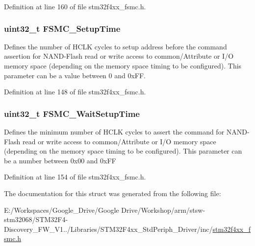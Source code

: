 Definition at line 160 of file stm32f4xx\-\_\-fsmc.\-h.

\hypertarget{struct_f_s_m_c___n_a_n_d___p_c_c_a_r_d_timing_init_type_def_a3b0b076d6c5cae5a023aba6d74ffb1b7}{
\subsubsection[{F\-S\-M\-C\-\_\-\-Setup\-Time}]{\setlength{\rightskip}{0pt plus 5cm}uint32\-\_\-t F\-S\-M\-C\-\_\-\-Setup\-Time}}\label{struct_f_s_m_c___n_a_n_d___p_c_c_a_r_d_timing_init_type_def_a3b0b076d6c5cae5a023aba6d74ffb1b7}
Defines the number of H\-C\-L\-K cycles to setup address before the command assertion for N\-A\-N\-D-\/\-Flash read or write access to common/\-Attribute or I/\-O memory space (depending on the memory space timing to be configured). This parameter can be a value between 0 and 0x\-F\-F. 

Definition at line 148 of file stm32f4xx\-\_\-fsmc.\-h.

\hypertarget{struct_f_s_m_c___n_a_n_d___p_c_c_a_r_d_timing_init_type_def_abf4f8b523317ce9a2e079c2b5ac1d857}{
\subsubsection[{F\-S\-M\-C\-\_\-\-Wait\-Setup\-Time}]{\setlength{\rightskip}{0pt plus 5cm}uint32\-\_\-t F\-S\-M\-C\-\_\-\-Wait\-Setup\-Time}}\label{struct_f_s_m_c___n_a_n_d___p_c_c_a_r_d_timing_init_type_def_abf4f8b523317ce9a2e079c2b5ac1d857}
Defines the minimum number of H\-C\-L\-K cycles to assert the command for N\-A\-N\-D-\/\-Flash read or write access to common/\-Attribute or I/\-O memory space (depending on the memory space timing to be configured). This parameter can be a number between 0x00 and 0x\-F\-F 

Definition at line 154 of file stm32f4xx\-\_\-fsmc.\-h.



The documentation for this struct was generated from the following file\-:\begin{DoxyCompactItemize}
\item 
E\-:/\-Workspaces/\-Google\-\_\-\-Drive/\-Google Drive/\-Workshop/arm/stsw-\/stm32068/\-S\-T\-M32\-F4-\/\-Discovery\-\_\-\-F\-W\-\_\-\-V1../\-Libraries/\-S\-T\-M32\-F4xx\-\_\-\-Std\-Periph\-\_\-\-Driver/inc/\hyperlink{stm32f4xx__fsmc_8h}{stm32f4xx\-\_\-fsmc.\-h}\end{DoxyCompactItemize}
